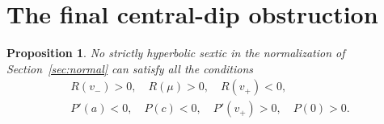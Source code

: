 \documentclass[11pt]{article}
\newtheorem{proposition}[theorem]{Proposition}
\theoremstyle{definition}
\begin{document}
\section{The final central-dip obstruction}\label{sec:central}

\begin{proposition}\label{prop:central}
No strictly hyperbolic sextic in the normalization of
Section~\ref{sec:normal} can satisfy all the conditions
\begin{equation}\label{eq:central-signs}
 \begin{gathered}
 R(v_-)>0,\quad R(\mu)>0,\quad R(v_+)<0,\\
 P'(a)<0,\quad P(c)<0,\quad P'(v_+)>0,\quad P(0)>0.
 \end{gathered}
\end{equation}
\end{proposition}
\end{document}
